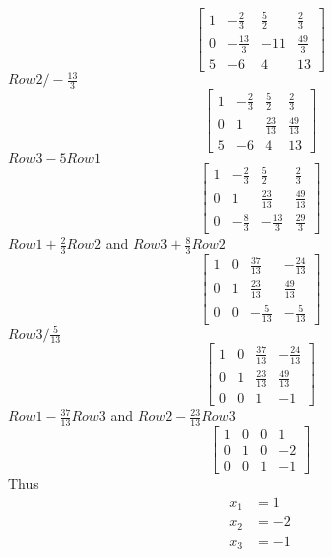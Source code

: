 \documentclass{article}
\begin{document}
           $$\begin{bmatrix}
            1&-\frac{2}{3}&\frac{5}{2}&\frac{2}{3}\\
            0&-\frac{13}{3}&-11&\frac{49}{3}\\
            5&-6&4&13
        \end{bmatrix}$$
        $Row2 /-\frac{13}{3}$
        $$\begin{bmatrix}
            1&-\frac{2}{3}&\frac{5}{2}&\frac{2}{3}\\
            0&1&\frac{23}{13}&\frac{49}{13}\\
            5&-6&4&13
        \end{bmatrix}$$
        $Row 3-5Row 1$
        $$\begin{bmatrix}
            1&-\frac{2}{3}&\frac{5}{2}&\frac{2}{3}\\
            0&1&\frac{23}{13}&\frac{49}{13}\\
            0&-\frac{8}{3}&-\frac{13}{3}&\frac{29}{3}
        \end{bmatrix}$$
        $Row 1+\frac{2}{3}Row 2$ and
        $Row 3+\frac{8}{3}Row 2$
        $$\begin{bmatrix}
            1&0&\frac{37}{13}&-\frac{24}{13}\\
            0&1&\frac{23}{13}&\frac{49}{13}\\
            0&0&-\frac{5}{13}&-\frac{5}{13}
        \end{bmatrix}$$
        $Row 3 /\frac{ 5}{13}$
        $$\begin{bmatrix}
            1&0&\frac{37}{13}&-\frac{24}{13}\\
            0&1&\frac{23}{13}&\frac{49}{13}\\
            0&0&1&-1
        \end{bmatrix}$$
        $Row 1 -\frac{37}{13}Row 3$ and $Row 2 -\frac{23}{13}Row 3$
        $$\begin{bmatrix}
            1&0&0&1\\
            0&1&0&-2\\
            0&0&1&-1
        \end{bmatrix}$$
        Thus
        \begin{equation*}
            \begin{split}
                x_1&=1\\
                x_2&=-2\\
                x_3&=-1
            \end{split}
        \end{equation*}
\end{document}
